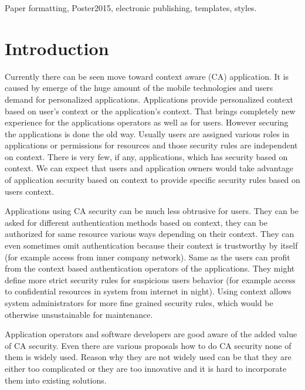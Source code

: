 \documentclass{poster15}
\begin{document}
\begin{keywords}
Paper formatting, Poster2015, electronic publishing, templates, styles.
\end{keywords}


\section{Introduction}

Currently there can be seen move toward context aware (CA) application. It is caused by emerge of the huge amount of the mobile technologies and users demand for personalized applications. Applications provide personalized context based on user's context or the application's context. That brings completely new experience for the applications operators as well as for users. However securing the applications is done the old way. Usually users are assigned various roles in applications or permissions for resources and those security rules are independent on context. There is very few, if any, applications, which has security based on context. We can expect that users and application owners would take advantage of application security based on context to provide specific security rules based on users context.

Applications using CA security can be much less obtrusive for users. They can be asked for different authentication methods based on context, they can be authorized for same resource various ways depending on their context. They can even sometimes omit authentication because their context is trustworthy by itself (for example access from inner company network). Same as the users can profit from the context based authentication operators of the applications. They might define more strict security rules for suspicious users behavior (for example access to confidential resources in system from internet in night). Using context allows system administrators for more fine grained security rules, which would be otherwise unsustainable for maintenance. 

Application operators and software developers are good aware of the added value of CA security. Even there are various proposals how to do CA security none of them is widely used. Reason why they are not widely used can be that they are either too complicated or they are too innovative and it is hard to incorporate them into existing solutions.
\end{document}
